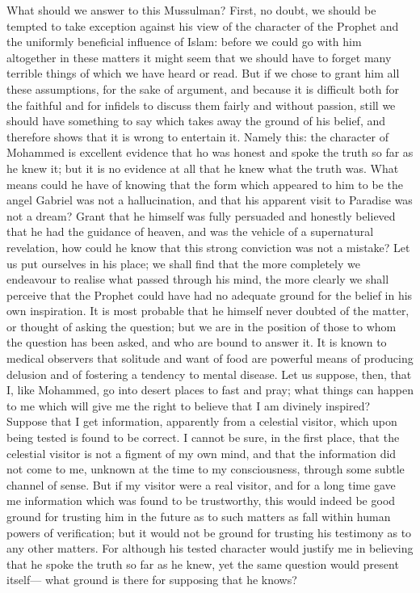 \documentclass[12pt]{article}
\begin{document}
What should we answer to this Mussulman? First, no doubt, we should be tempted to take exception against his view of the character of the Prophet and the uniformly beneficial influence of Islam: before we could go with him altogether in these matters it might seem that we should have to forget many terrible things of which we have heard or read. But if we chose to grant him all these assumptions, for the sake of argument, and because it is difficult both for the faithful and for infidels to discuss them fairly and without passion, still we should have something to say which takes away the ground of his belief, and therefore shows that it is wrong to entertain it. Namely this: the character of Mohammed is excellent evidence that ho was honest and spoke the truth so far as he knew it; but it is no evidence at all that he knew what the truth was. What means could he have of knowing that the form which appeared to him to be the angel Gabriel was not a hallucination, and that his apparent visit to Paradise was not a dream? Grant that he himself was fully persuaded and honestly believed that he had the guidance of heaven, and was the vehicle of a supernatural revelation, how could he know that this strong conviction was not a mistake? Let us put ourselves in his place; we shall find that the more completely we endeavour to realise what passed through his mind, the more clearly we shall perceive that the Prophet could have had no adequate ground for the belief in his own inspiration. It is most probable that he himself never doubted of the matter, or thought of asking the question; but we are in the position of those to whom the question has been asked, and who are bound to answer it. It is known to medical observers that solitude and want of food are powerful means of producing delusion and of fostering a tendency to mental disease. Let us suppose, then, that I, like Mohammed, go into desert places to fast and pray; what things can happen to me which will give me the right to believe that I am divinely inspired? Suppose that I get information, apparently from a celestial visitor, which upon being tested is found to be correct. I cannot be sure, in the first place, that the celestial visitor is not a figment of my own mind, and that the information did not come to me, unknown at the time to my consciousness, through some subtle channel of sense. But if my visitor were a real visitor, and for a long time gave me information which was found to be trustworthy, this would indeed be good ground for trusting him in the future as to such matters as fall within human powers of verification; but it would not be ground for trusting his testimony as to any other matters. For although his tested character would justify me in believing that he spoke the truth so far as he knew, yet the same question would present itself--- what ground is there for supposing that he knows?
\end{document}
